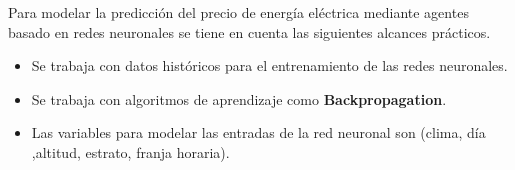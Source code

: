 Para modelar la predicción del precio de energía eléctrica mediante agentes basado en redes neuronales se tiene en cuenta las siguientes alcances prácticos.

\begin{itemize}
 \item Se trabaja con datos históricos para el entrenamiento de las redes neuronales.
 \item Se trabaja con algoritmos de aprendizaje como \textbf{Backpropagation}.
 \item Las variables para modelar las entradas de la red neuronal son (clima, día ,altitud, estrato, franja horaria).
\end{itemize}

